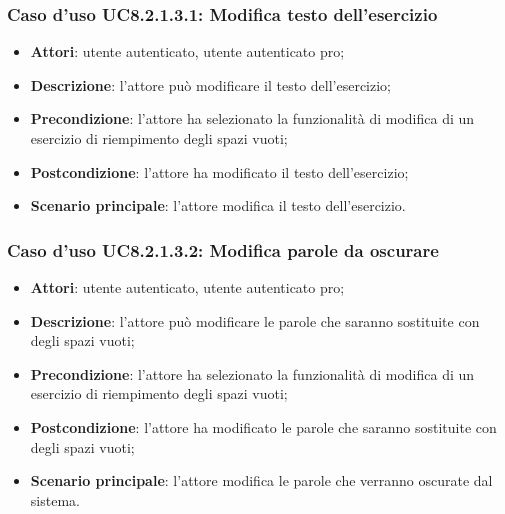 \subsubsection{Caso d'uso UC8.2.1.3.1: Modifica testo dell'esercizio}
	\begin{itemize}
		\item
			\textbf{Attori}: utente autenticato, utente autenticato pro;
		\item		
			\textbf{Descrizione}: l'attore può modificare il testo dell'esercizio;
		\item
			\textbf{Precondizione}: l'attore ha selezionato la funzionalità di modifica di un esercizio di riempimento degli spazi vuoti; 
		\item
			\textbf{Postcondizione}: l'attore ha modificato il testo dell'esercizio;
		\item
			\textbf{Scenario principale}: l'attore modifica il testo dell'esercizio.
	\end{itemize}


\subsubsection{Caso d'uso UC8.2.1.3.2: Modifica parole da oscurare}
	\begin{itemize}
		\item
			\textbf{Attori}: utente autenticato, utente autenticato pro;
		\item		
			\textbf{Descrizione}: l'attore può modificare le parole che saranno sostituite con degli spazi vuoti;
		\item
			\textbf{Precondizione}: l'attore ha selezionato la funzionalità di modifica di un esercizio di riempimento degli spazi vuoti; 
		\item
			\textbf{Postcondizione}: l'attore ha modificato le parole che saranno sostituite con degli spazi vuoti;
		\item
			\textbf{Scenario principale}: l'attore modifica le parole che verranno oscurate dal sistema.
	\end{itemize}